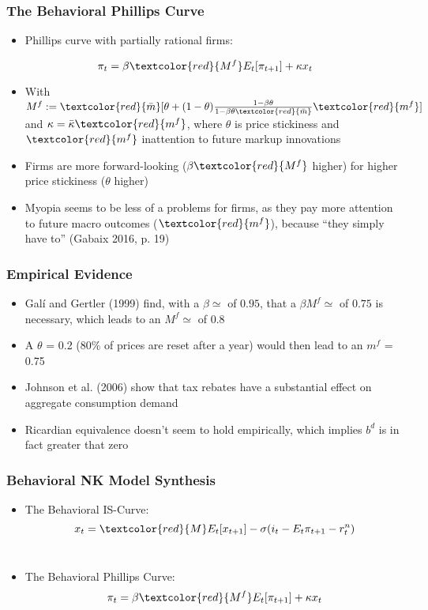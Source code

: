 \documentclass{beamer}
\begin{document}

\begin{frame}
\frametitle{The Behavioral Phillips Curve}
\begin{itemize}
\item Phillips curve with partially rational firms:
\end{itemize}
	$$\pi_{t}=\beta \textcolor{red}{M^{f}}E_{t}[\pi_{t+1}]+\kappa x_{t}$$
\begin{itemize}
\item With $M^{f}:=\textcolor{red}{\bar m}[\theta+(1-\theta)\frac{1-\beta \theta}{1-\beta \theta \textcolor{red}{\bar m}}\textcolor{red}{m^{f}}]$ and $\kappa=\bar \kappa \textcolor{red}{m^{f}}$, where $\theta$ is price stickiness and $\textcolor{red}{m^{f}}$ inattention to future markup innovations
\item Firms are more forward-looking ($\beta \textcolor{red}{ M^{f}}$ higher) for higher price stickiness ($\theta$ higher) 
\item Myopia seems to be less of a problems for firms, as they pay more attention to future macro outcomes ($\textcolor{red}{m^{f}}$),  because ``they simply have to'' (Gabaix 2016, p. 19)
\end{itemize}
\end{frame}


\begin{frame}
\frametitle{Empirical Evidence}
\begin{itemize}
\item Gal\'{i} and Gertler (1999) find, with a $\beta \simeq$ of $0.95$, that a $\beta M^{f}\simeq$ of $0.75$ is necessary, which leads to an $M^{f}\simeq$ of $0.8$
\item A $\theta$ = 0.2 (80\% of prices are reset after a year) would then lead to an ${m^{f}}$ = 0.75
\item Johnson et al. (2006) show that tax rebates have a substantial effect on aggregate consumption demand
\item Ricardian equivalence doesn't seem to hold empirically, which implies $b^{d}$ is in fact greater that zero  
\end{itemize}
\end{frame}


\begin{frame}
	\frametitle{Behavioral NK Model Synthesis}
	\begin{itemize}
		\item The Behavioral IS-Curve: $$x_{t}=\textcolor{red}{M}E_{t}[x_{t+1}]-\sigma(i_{t}-E_{t}\pi_{t+1}-r_{t}^{n})$$\\
		\vspace{5pt}
		\item The Behavioral Phillips Curve: $$\pi_{t}=\beta \textcolor{red}{M^{f}}E_{t}[\pi_{t+1}]+\kappa x_{t}$$
	\end{itemize}
\end{frame}
\end{document}
